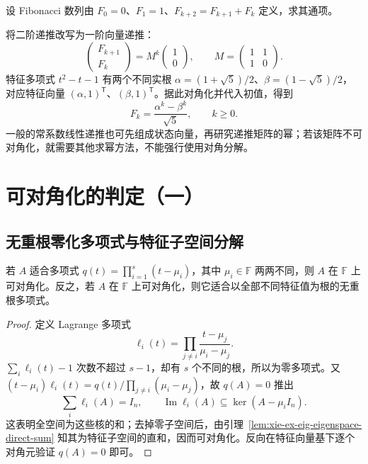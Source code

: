 \begin{example}
设 Fibonacci 数列由 $F_0=0$、$F_1=1$、$F_{k+2}=F_{k+1}+F_k$ 定义，求其通项。
\end{example}
\begin{solve}
将二阶递推改写为一阶向量递推：
\[
\begin{pmatrix}F_{k+1}\\F_k\end{pmatrix}
=M^k\begin{pmatrix}1\\0\end{pmatrix},\qquad
M=\begin{pmatrix}1&1\\1&0\end{pmatrix}.
\]
特征多项式 $t^2-t-1$ 有两个不同实根 $\alpha=(1+\sqrt5)/2$、$\beta=(1-\sqrt5)/2$，对应特征向量 $(\alpha,1)^{\mathsf T}$、$(\beta,1)^{\mathsf T}$。据此对角化并代入初值，得到
\[
F_k=\frac{\alpha^k-\beta^k}{\sqrt5},\qquad k\ge0.
\]
一般的常系数线性递推也可先组成状态向量，再研究递推矩阵的幂；若该矩阵不可对角化，就需要其他求幂方法，不能强行使用对角分解。
\end{solve}

\section{可对角化的判定（一）}
\label{sec:xie-ex-eig-diagonalization-tests}

\subsection{无重根零化多项式与特征子空间分解}

\begin{theorem}
\label{thm:xie-ex-eig-squarefree-annihilator}
若 $A$ 适合多项式 $q(t)=\prod_{i=1}^s(t-\mu_i)$，其中 $\mu_i\in\mathbb F$ 两两不同，则 $A$ 在 $\mathbb F$ 上可对角化。反之，若 $A$ 在 $\mathbb F$ 上可对角化，则它适合以全部不同特征值为根的无重根多项式。
\end{theorem}
\begin{proof}
定义 Lagrange 多项式
\[
\ell_i(t)=\prod_{j\ne i}\frac{t-\mu_j}{\mu_i-\mu_j}.
\]
$\sum_i\ell_i(t)-1$ 次数不超过 $s-1$，却有 $s$ 个不同的根，所以为零多项式。又 $(t-\mu_i)\ell_i(t)=q(t)/\prod_{j\ne i}(\mu_i-\mu_j)$，故 $q(A)=0$ 推出
\[
\sum_i\ell_i(A)=I_n,\qquad
\operatorname{Im}\ell_i(A)\subseteq\ker(A-\mu_iI_n).
\]
这表明全空间为这些核的和；去掉零子空间后，由引理~\ref{lem:xie-ex-eig-eigenspace-direct-sum} 知其为特征子空间的直和，因而可对角化。反向在特征向量基下逐个对角元验证 $q(A)=0$ 即可。
\end{proof}

